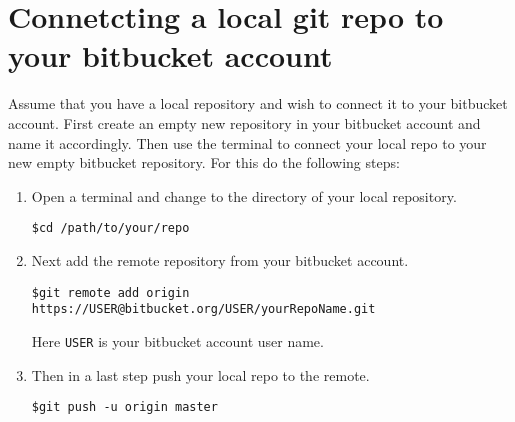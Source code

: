 \documentclass{article}
\begin{document}
\section{Connetcting a local git repo to your bitbucket account}
Assume that you have a local repository and wish to connect it to your bitbucket account.
First create an empty new repository in your bitbucket account and name it accordingly.
Then use the terminal to connect your local repo to your new empty bitbucket repository.
For this do the following steps:

\begin{enumerate}
	
	\item Open a terminal and change to the directory of your local repository.
\begin{lstlisting}
$cd /path/to/your/repo
\end{lstlisting}
	
	\item Next add the remote repository from your bitbucket account.
\begin{lstlisting}
$git remote add origin https://USER@bitbucket.org/USER/yourRepoName.git
\end{lstlisting}
	Here \verb|USER| is your bitbucket account user name.
	
	\item Then in a last step push your local repo to the remote.
\begin{lstlisting}
$git push -u origin master
\end{lstlisting}
	
\end{enumerate}
\end{document}
